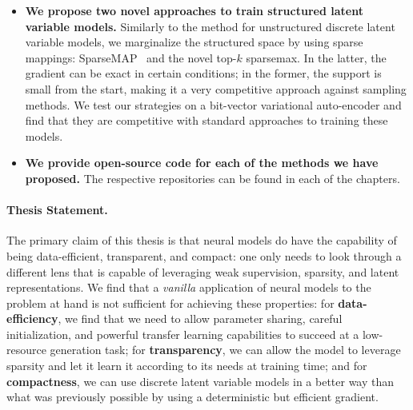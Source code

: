 \begin{itemize}
    \item \textbf{We propose two novel approaches to train structured latent variable models.}
          Similarly to the method for unstructured discrete latent variable models, we marginalize
          the structured space by using sparse mappings: SparseMAP~\citep{sparsemap} and the novel top-$k$
          sparsemax. In the latter, the gradient can be exact in certain conditions; in the former,
          the support is small from the start, making it a very competitive approach against sampling methods.
          We test our strategies on a bit-vector variational auto-encoder and find that
          they are competitive with standard approaches to training these models.

    \item \textbf{We provide open-source code for each of the
              methods we have proposed.}
          The respective repositories can be found in each
          of the chapters.


\end{itemize}

\paragraph*{Thesis Statement.} The primary claim of this thesis is
that neural
models do have the capability of being data-efficient, transparent, and
compact: one only needs to look through a different lens that is
capable of leveraging weak supervision, sparsity, and latent
representations. We find that a \textit{vanilla}
application of neural models to the problem at hand is not sufficient
for achieving these properties: for \textbf{data-efficiency}, we find that we need
to allow parameter sharing, careful initialization, and powerful
transfer learning capabilities to succeed at a low-resource
generation task; for \textbf{transparency}, we can allow the model to leverage
sparsity and let it learn it according to its needs at training time; and
for \textbf{compactness}, we can use discrete latent variable models in a
better way than what was previously possible by using a deterministic but
efficient gradient.
